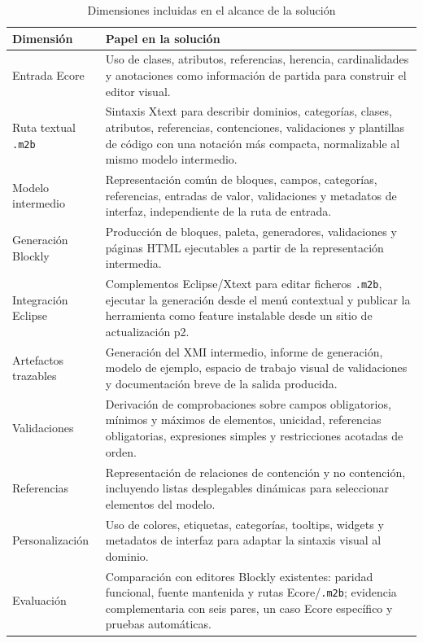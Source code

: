 \begin{table}[h]
  \centering
  \begin{tabular}{|p{}|p{}|}
    \hline
    Dimensión & Papel en la solución \\
    \hline
    Entrada Ecore & Uso de clases, atributos, referencias, herencia,
    cardinalidades y anotaciones como información de partida para construir el
    editor visual. \\
    Ruta textual \texttt{.m2b} & Sintaxis Xtext para describir dominios, categorías,
    clases, atributos, referencias, contenciones, validaciones y plantillas de
    código con una notación más compacta, normalizable al mismo modelo
    intermedio. \\
    Modelo intermedio & Representación común de bloques, campos, categorías,
    referencias, entradas de valor, validaciones y metadatos de interfaz,
    independiente de la ruta de entrada. \\
	    Generación Blockly & Producción de bloques, paleta, generadores,
	    validaciones y páginas HTML ejecutables a partir de la representación
	    intermedia. \\
	    Integración Eclipse & Complementos Eclipse/Xtext para editar ficheros
	    \texttt{.m2b}, ejecutar la generación desde el menú contextual y
	    publicar la herramienta como feature instalable desde un sitio de actualización p2. \\
	    Artefactos trazables & Generación del XMI intermedio, informe de generación,
	    modelo de ejemplo, espacio de trabajo visual de validaciones y documentación breve de
	    la salida producida. \\
	    Validaciones & Derivación de comprobaciones sobre campos obligatorios,
	    mínimos y máximos de elementos, unicidad, referencias obligatorias,
	    expresiones simples y restricciones acotadas de orden. \\
    Referencias & Representación de relaciones de contención y no contención,
    incluyendo listas desplegables dinámicas para seleccionar elementos del
    modelo. \\
    Personalización & Uso de colores, etiquetas, categorías, tooltips, widgets
    y metadatos de interfaz para adaptar la sintaxis visual al dominio. \\
    Evaluación & Comparación con editores Blockly existentes: paridad funcional,
    fuente mantenida y rutas Ecore/\texttt{.m2b}; evidencia complementaria con
    seis pares, un caso Ecore específico y pruebas automáticas. \\
    \hline
  \end{tabular}
  \caption{Dimensiones incluidas en el alcance de la solución}
  \label{tab:alcance-funcional}
\end{table}

